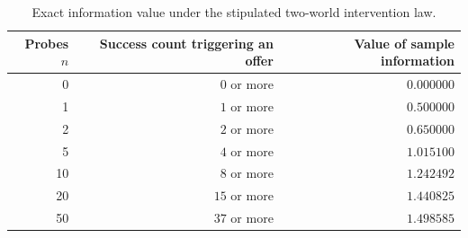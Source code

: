 \begin{table}[htbp]
\centering
\caption{Exact information value under the stipulated two-world intervention law.}
\label{exec14:l4-evsi-table}
\begin{tabular}{rrr}
\toprule
Probes $n$ & Success count triggering an offer & Value of sample information\\
\midrule
0 & $0$ or more & $0.000000$\\
1 & $1$ or more & $0.500000$\\
2 & $2$ or more & $0.650000$\\
5 & $4$ or more & $1.015100$\\
10 & $8$ or more & $1.242492$\\
20 & $15$ or more & $1.440825$\\
50 & $37$ or more & $1.498585$\\
\bottomrule
\end{tabular}
\end{table}
